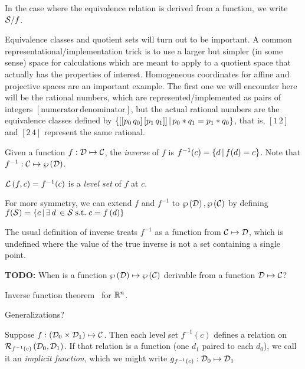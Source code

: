In the case where the equivalence relation is derived from a
function, we write $\mathcal{S} / f$.

Equivalence classes and quotient sets will turn out to be
important. A common representational/implementation trick is to
use a larger but simpler (in some sense) space for calculations
which are meant to apply to a quotient space that actually has the
properties of interest. Homogeneous coordinates for affine and
projective spaces  are an important example.
The first one we will encounter here will be the rational numbers,
which are represented/implemented as pairs of integers
$[\text{numerator} \, \text{denominator}]$, but the actual
rational numbers are the equivalence classes defined by 
$ \left\{  [[p_0 \, q_0] \, [p_1 \, q_1]] \, | \, p_0*q_1 = p_1*q_0  \right\} $,
that is, $[1 \, 2]$ and $[2 \, 4]$ represent the same rational.

\label{sec:Inverses-and-pseudo-inverses}

Given a function $f : \mathcal{D} \mapsto \mathcal{C}$,
the \textit{inverse} of $f$ is 
$f^{-1}(c) =  \left\{ d \, | \, f(d) = c \right\} $.
Note that $f^{-1} : \mathcal{C}  \mapsto  \wp \left( \mathcal{D} \right) $.

$\mathcal{L}\left( f , c \right) = f^{-1}(c)$ is a \textit{level set} of
$f$ at $c$.

For more symmetry, we can extend $f$ and $f^{-1}$ to 
$ \wp \left( \mathcal{D} \right)   ,  \wp \left( \mathcal{C} \right) $
by defining
$f(\mathcal{S}) = 
 \left\{ c \, | \, \exists \, d \, \in \mathcal{S} \; \text{s.t.} \; c = f \left( d \right) \right\} $

The usual definition of inverse treats $f^{-1}$
as a function from $\mathcal{C} \mapsto \mathcal{D}$,
which is undefined where the value of the true
inverse is not a set containing a single point.

\textbf{TODO:} When is a function 
$ \wp \left( \mathcal{D} \right)   \mapsto  \wp \left( \mathcal{C} \right) $
derivable from a function $\mathcal{D} \mapsto \mathcal{C}$?

Inverse function theorem~\cite[Theorem~2-1]{spivak-1965}
for $\mathbb{R}^n$. 

Generalizations?~\cite{wiki:Inverse-function-theorem}

\label{sec:Implicit-functions}

Suppose 
$f : \left( \mathcal{D}_0 \times \mathcal{D}_1 \right) \mapsto \mathcal{C}$.
Then each level set $f^{-1}\left( c \right)$ defines a relation on 
$\mathcal{R}_{f^{-1}(c)} \left( \mathcal{D}_0 , \mathcal{D}_1 \right)$.
If that relation is a function
(one $d_1$ paired to each $d_0$),
we call it an \textit{implicit function},
which we might write $g_{f^{-1}(c)} : \mathcal{D}_0 \mapsto \mathcal{D}_1$

